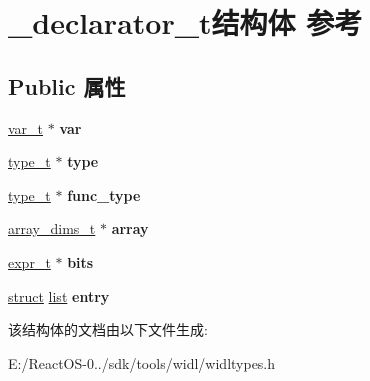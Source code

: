 \hypertarget{struct__declarator__t}{}\section{\+\_\+declarator\+\_\+t结构体 参考}
\label{struct__declarator__t}
\subsection*{Public 属性}
\begin{DoxyCompactItemize}
\item 
\mbox{\label{struct__declarator__t_a7a3d4e8fc2204cf312a2743e90a803a7}} 
\hyperlink{struct__var__t}{var\+\_\+t} $\ast$ {\bfseries var}
\item 
\mbox{\label{struct__declarator__t_a19c5f50f4ee7b1b6f4fca53f369170cd}} 
\hyperlink{struct__type__t}{type\+\_\+t} $\ast$ {\bfseries type}
\item 
\mbox{\label{struct__declarator__t_aaf896f0246acc51766699c95b44fdde1}} 
\hyperlink{struct__type__t}{type\+\_\+t} $\ast$ {\bfseries func\+\_\+type}
\item 
\mbox{\label{struct__declarator__t_aea11f9181502fa49a382b5b3ff2931b5}} 
\hyperlink{classlist}{array\+\_\+dims\+\_\+t} $\ast$ {\bfseries array}
\item 
\mbox{\label{struct__declarator__t_a8a219e3f23d7e31aaa36a1eb01721d7a}} 
\hyperlink{struct__expr__t}{expr\+\_\+t} $\ast$ {\bfseries bits}
\item 
\mbox{\label{struct__declarator__t_ac8f0df21f8d0e8df1158b77eb2011ba9}} 
\hyperlink{interfacestruct}{struct} \hyperlink{classlist}{list} {\bfseries entry}
\end{DoxyCompactItemize}


该结构体的文档由以下文件生成\+:\begin{DoxyCompactItemize}
\item 
E\+:/\+React\+O\+S-\/0../sdk/tools/widl/widltypes.\+h\end{DoxyCompactItemize}
